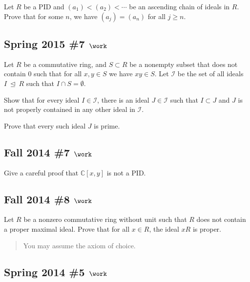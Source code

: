 Let \(R\) be a PID and \((a_1) < (a_2) < \cdots\) be an ascending chain
of ideals in \(R\). Prove that for some \(n\), we have \((a_j) = (a_n)\)
for all \(j\geq n\).

\hypertarget{spring-2015-7-work}{%
\subsection{\texorpdfstring{Spring 2015 \#7
\(\work\)}{Spring 2015 \#7 \textbackslash work}}\label{spring-2015-7-work}}

Let \(R\) be a commutative ring, and \(S\subset R\) be a nonempty subset
that does not contain 0 such that for all \(x, y\in S\) we have
\(xy\in S\). Let \({\mathcal{I}}\) be the set of all ideals
\(I{~\trianglelefteq~}R\) such that \(I\cap S = \emptyset\).

Show that for every ideal \(I\in {\mathcal{I}}\), there is an ideal
\(J\in {\mathcal{I}}\) such that \(I\subset J\) and \(J\) is not
properly contained in any other ideal in \({\mathcal{I}}\).

Prove that every such ideal \(J\) is prime.

\hypertarget{fall-2014-7-work}{%
\subsection{\texorpdfstring{Fall 2014 \#7
\(\work\)}{Fall 2014 \#7 \textbackslash work}}\label{fall-2014-7-work}}

Give a careful proof that \({\mathbb{C}}[x, y]\) is not a PID.

\hypertarget{fall-2014-8-work}{%
\subsection{\texorpdfstring{Fall 2014 \#8
\(\work\)}{Fall 2014 \#8 \textbackslash work}}\label{fall-2014-8-work}}

Let \(R\) be a nonzero commutative ring without unit such that \(R\)
does not contain a proper maximal ideal. Prove that for all \(x\in R\),
the ideal \(xR\) is proper.

\begin{quote}
You may assume the axiom of choice.
\end{quote}

\hypertarget{spring-2014-5-work}{%
\subsection{\texorpdfstring{Spring 2014 \#5
\(\work\)}{Spring 2014 \#5 \textbackslash work}}\label{spring-2014-5-work}}

